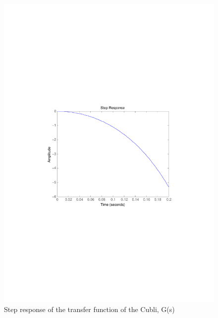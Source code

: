 \begin{figure}[H] 
	\centering 
	\includegraphics[scale=0.8]{figures/stepResponseTF}
	\centering
	\captionsetup{justification=centering}	
	\caption{Step response of the transfer function of the Cubli, G(s)}
	\label{stepCubliTF}
\end{figure}


